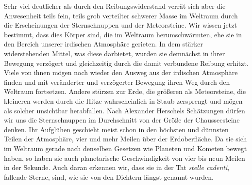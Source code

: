 \documentclass[a4paper, 11pt, oneside, german]{article}
\begin{document}
Sehr viel deutlicher als durch den Reibungswiderstand verrät sich aber die Anwesenheit teils fein, teils grob verteilter schwerer Masse im Weltraum durch die Erscheinungen der Sternschnuppen und der Meteorsteine. Wir wissen jetzt bestimmt, dass dies Körper sind, die im Weltraum herumschwärmten, ehe sie in den Bereich unserer irdischen Atmosphäre gerieten. In dem stärker widerstehenden Mittel, was diese darbietet, wurden sie demnächst in ihrer Bewegung verzögert und gleichzeitig durch die damit verbundene Reibung erhitzt. Viele von ihnen mögen noch wieder den Ausweg aus der irdischen Atmosphäre finden und mit veränderter und verzögerter Bewegung ihren Weg durch den Weltraum fortsetzen. Andere stürzen zur Erde, die größeren als Meteorsteine, die kleineren werden durch die Hitze wahrscheinlich in Staub zersprengt und mögen als solcher unsichtbar herabfallen. Nach Alexander Herschels Schätzungen dürfen wir uns die Sternschnuppen im Durchschnitt von der Größe der Chausseesteine denken. Ihr Aufglühen geschieht meist schon in den höchsten und dünnsten Teilen der Atmosphäre, vier und mehr Meilen über der Erdoberfläche. Da sie sich im Weltraum gerade nach denselben Gesetzen wie Planeten und Kometen bewegt haben, so haben sie auch planetarische Geschwindigkeit von vier bis neun Meilen in der Sekunde. Auch daran erkennen wir, dass sie in der Tat \emph{stelle cadenti}, fallende Sterne, sind, wie sie von den Dichtern längst genannt wurden.
\end{document}
